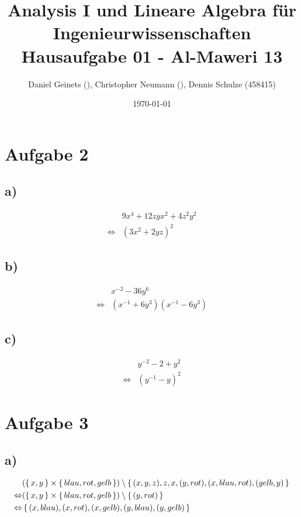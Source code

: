 \documentclass[a4paper, 11pt]{article}
\author{Daniel Geinets (), Christopher Neumann (), Dennis Schulze (458415)}
\date{\today}
\title{Analysis I und Lineare Algebra für Ingenieurwissenschaften \large  \\ Hausaufgabe 01 - Al-Maweri 13}
\begin{document}
\maketitle
\tableofcontents

\setcounter{secnumdepth}{0}

\pagebreak

\section{Aufgabe 2}
\label{sec:orga4ea61f}
\subsection{a)}
\label{sec:orga16b81e}
\begin{align*}
    & 9x^4 + 12zyx^2 + 4z^2y^2 \\
    \Leftrightarrow & (3x^2 + 2yz)^2
\end{align*}

\subsection{b)}
\label{sec:orgfa65ac7}
\begin{align*}
    & x^{-2} - 36y^6 \\
    \Leftrightarrow & (x^{-1} + 6y^3)(x^{-1} - 6y^3)
\end{align*}

\subsection{c)}
\label{sec:orgba6eb2f}
\begin{align*}
    & y^{-2} - 2 + y^2 \\
    \Leftrightarrow & (y^{-1} - y)^2
\end{align*}

\section{Aufgabe 3}
\label{sec:orged56921}
\subsection{a)}
\label{sec:org7122508}
\begin{align*}
    & ( \set{x, y}  \times \set{blau, rot, gelb}) \setminus \set{(x, y, z), z, x, (y, rot), (x, blau, rot), (gelb, y)} \\
    \Leftrightarrow & (\set{x, y} \times \set{blau, rot, gelb}) \setminus \set{(y, rot)} \\
    \Leftrightarrow & \set{(x, blau), (x, rot), (x, gelb), (y, blau), (y, gelb)}
\end{align*}
\end{document}
